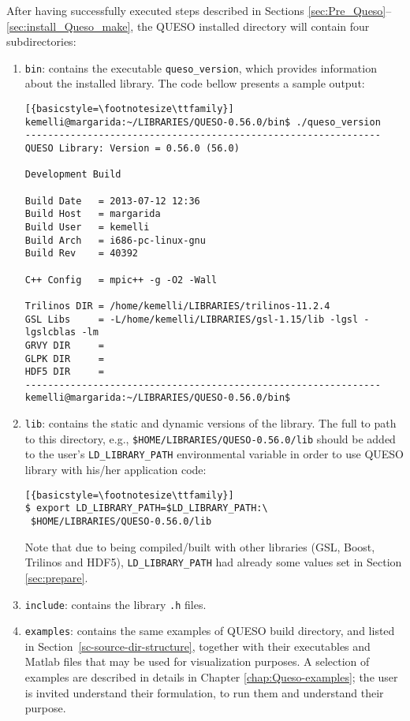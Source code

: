 After having successfully executed steps described in Sections \ref{sec:Pre_Queso}--\ref{sec:install_Queso_make}, the QUESO installed directory will contain four subdirectories:
\begin{enumerate}
 \item \verb+bin+: contains the executable \verb+queso_version+, which provides information about the installed library. The code bellow presents a sample output:

\begin{lstlisting}[{basicstyle=\footnotesize\ttfamily}]
kemelli@margarida:~/LIBRARIES/QUESO-0.56.0/bin$ ./queso_version 
---------------------------------------------------------------
QUESO Library: Version = 0.56.0 (56.0)

Development Build

Build Date   = 2013-07-12 12:36
Build Host   = margarida
Build User   = kemelli
Build Arch   = i686-pc-linux-gnu
Build Rev    = 40392

C++ Config   = mpic++ -g -O2 -Wall

Trilinos DIR = /home/kemelli/LIBRARIES/trilinos-11.2.4
GSL Libs     = -L/home/kemelli/LIBRARIES/gsl-1.15/lib -lgsl -lgslcblas -lm
GRVY DIR     = 
GLPK DIR     = 
HDF5 DIR     = 
---------------------------------------------------------------
kemelli@margarida:~/LIBRARIES/QUESO-0.56.0/bin$ 
\end{lstlisting}

 \item \verb+lib+: contains the static and dynamic versions of the library. The full to path to this directory, e.g., \verb+$HOME/LIBRARIES/QUESO-0.56.0/lib+ should be added to the user's \verb+LD_LIBRARY_PATH+ environmental variable in order to use QUESO library with his/her application code:
\begin{lstlisting}[{basicstyle=\footnotesize\ttfamily}]
$ export LD_LIBRARY_PATH=$LD_LIBRARY_PATH:\
 $HOME/LIBRARIES/QUESO-0.56.0/lib
\end{lstlisting}


Note that due to \Queso{} being compiled/built with other libraries (GSL, Boost, Trilinos and HDF5), \verb+LD_LIBRARY_PATH+ had already some values set in Section \ref{sec:prepare}.


 \item \verb+include+: contains the library \verb+.h+ files.

 \item \verb+examples+: contains the same examples of QUESO build directory, and listed in Section~\ref{sc-source-dir-structure}, together with their executables and Matlab files that may be used for visualization purposes. A selection of examples are described in details in Chapter \ref{chap:Queso-examples}; the user is invited understand their formulation, to run them and understand their purpose. 


\end{enumerate}




